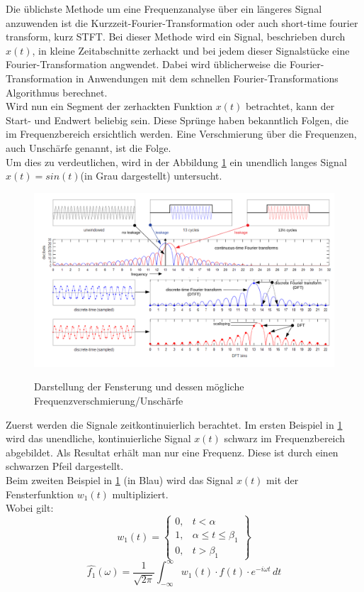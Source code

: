 
Die üblichste Methode um eine Frequenzanalyse über ein längeres Signal anzuwenden ist die  Kurzzeit-Fourier-Transformation oder auch short-time fourier transform, kurz STFT. Bei dieser Methode wird ein Signal, beschrieben durch $x(t)$, in kleine Zeitabschnitte zerhackt und bei jedem dieser Signalstücke eine Fourier-Transformation angwendet. Dabei wird üblicherweise die Fourier-Transformation in Anwendungen mit dem schnellen Fourier-Transformations Algorithmus berechnet.\\

Wird nun ein Segment der zerhackten Funktion $x(t)$ betrachtet, kann der Start- und Endwert beliebig sein. Diese Sprünge haben bekanntlich Folgen, die im Frequenzbereich ersichtlich werden. Eine Verschmierung über die Frequenzen, auch Unschärfe genannt, ist die Folge. \\

Um dies zu verdeutlichen, wird in der Abbildung \ref{fig:Spectral} ein unendlich langes Signal $x(t)=sin(t)$(in Grau dargestellt) untersucht. 
\begin{figure}[!ht]
	\centering
	\includegraphics[scale=0.8]{papers/autotune/sections/fft/images/windows/Spectral.pdf}
	\caption{Darstellung der Fensterung und dessen mögliche Frequenzverschmierung/Unschärfe}\cite{wikipedia:Window}
	\label{fig:Spectral}
\end{figure}%

Zuerst werden die Signale zeitkontinuierlich berachtet. Im ersten Beispiel in \ref{fig:Spectral} wird das unendliche, kontinuierliche Signal $x(t)$ schwarz im Frequenzbereich abgebildet. Als Resultat erhält man nur eine Frequenz. Diese ist durch einen schwarzen Pfeil dargestellt.\\

Beim zweiten Beispiel in \ref{fig:Spectral} (in Blau) wird das Signal $x(t)$ mit der Fensterfunktion $w_{1}(t)$ multipliziert.\\
Wobei gilt: 
\begin{equation}
	w_{1}(t)= \left\{\begin{array}{lll}{0,} & {t<\alpha}  \\ {1,}&{\alpha\leq t \leq\beta_{1}} \\ {0,} &{t>\beta_{1}}\end{array}\right\}
\end{equation}
\begin{equation}
	\hat{f_{1}}(\omega)=\frac{1}{\sqrt{2 \pi}} \int_{-\infty}^{\infty} w_{1}(t)\cdot f(t) \cdot e^{-i \omega t} \,dt
\end{equation}

